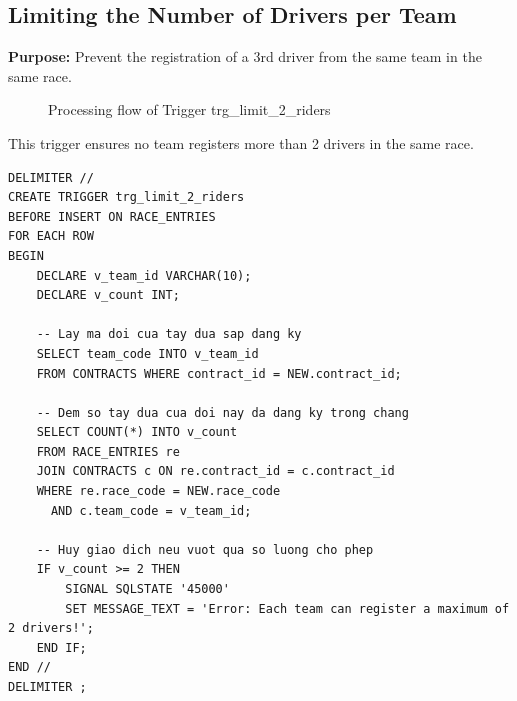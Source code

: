 \documentclass[12pt, a4paper]{report}
\begin{document}
\subsection{Limiting the Number of Drivers per Team}

\textbf{Purpose:} Prevent the registration of a 3rd driver from the same team in the same race.


\begin{figure}[h]
\centering
\hspace*{-1.5cm} %
\caption{Processing flow of Trigger trg\_limit\_2\_riders}
\end{figure}

This trigger ensures no team registers more than 2 drivers in the same race.
\begin{lstlisting}[caption={Trigger --- trg\_limit\_2\_riders}]
DELIMITER //
CREATE TRIGGER trg_limit_2_riders
BEFORE INSERT ON RACE_ENTRIES
FOR EACH ROW
BEGIN
    DECLARE v_team_id VARCHAR(10);
    DECLARE v_count INT;
    
    -- Lay ma doi cua tay dua sap dang ky
    SELECT team_code INTO v_team_id 
    FROM CONTRACTS WHERE contract_id = NEW.contract_id;
    
    -- Dem so tay dua cua doi nay da dang ky trong chang
    SELECT COUNT(*) INTO v_count 
    FROM RACE_ENTRIES re 
    JOIN CONTRACTS c ON re.contract_id = c.contract_id
    WHERE re.race_code = NEW.race_code 
      AND c.team_code = v_team_id;
      
    -- Huy giao dich neu vuot qua so luong cho phep
    IF v_count >= 2 THEN
        SIGNAL SQLSTATE '45000' 
        SET MESSAGE_TEXT = 'Error: Each team can register a maximum of 2 drivers!';
    END IF;
END //
DELIMITER ;
\end{lstlisting}
\end{document}

